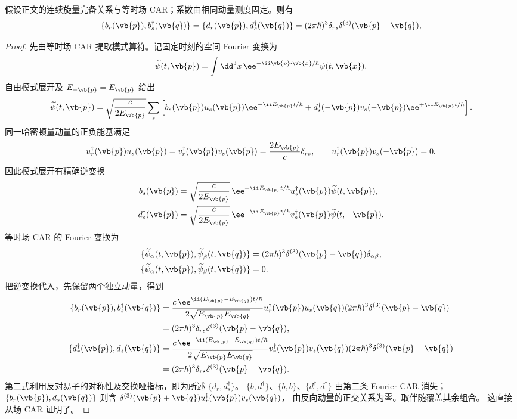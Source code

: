 \begin{proposition}
假设正文的连续旋量完备关系与等时场 CAR；系数由相同动量测度固定。则有
\begin{equation}
{
\{b_r(\vb{p}),b_s^\dagger(\vb{q})\}
=\{d_r(\vb{p}),d_s^\dagger(\vb{q})\}
=(2\pi\hbar)^3\delta_{rs}\delta^{(3)}(\vb{p}-\vb{q}),}
\label{eq:fermion-anticomm-normalization-r2}
\end{equation}
\end{proposition}
\begin{proof}
先由等时场 CAR 提取模式算符。记固定时刻的空间 Fourier 变换为
\[
\widetilde\psi(t,\vb{p})
=\int\dd^3x\,\ee^{-\ii\vb{p}\cdot\vb{x}/\hbar}\psi(t,\vb{x}).
\]
自由模式展开及 $E_{-\vb{p}}=E_{\vb{p}}$ 给出
\[
\widetilde\psi(t,\vb{p})
=\sqrt{\frac{c}{2E_{\vb{p}}}}
\sum_s\left[
b_s(\vb{p})u_s(\vb{p})\ee^{-\ii E_{\vb{p}}t/\hbar}
+d_s^\dagger(-\vb{p})v_s(-\vb{p})\ee^{+\ii E_{\vb{p}}t/\hbar}
\right].
\]
同一哈密顿量动量的正负能基满足
\[
u_r^\dagger(\vb{p})u_s(\vb{p})
=v_r^\dagger(\vb{p})v_s(\vb{p})
=\frac{2E_{\vb{p}}}c\delta_{rs},
\qquad
u_r^\dagger(\vb{p})v_s(-\vb{p})=0.
\]
因此模式展开有精确逆变换
\begin{align*}
b_s(\vb{p})
&=\sqrt{\frac{c}{2E_{\vb{p}}}}\,
\ee^{+\ii E_{\vb{p}}t/\hbar}
u_s^\dagger(\vb{p})\widetilde\psi(t,\vb{p}),\\
d_s^\dagger(\vb{p})
&=\sqrt{\frac{c}{2E_{\vb{p}}}}\,
\ee^{-\ii E_{\vb{p}}t/\hbar}
v_s^\dagger(\vb{p})\widetilde\psi(t,-\vb{p}).
\end{align*}
等时场 CAR 的 Fourier 变换为
\begin{align*}
\{\widetilde\psi_\alpha(t,\vb{p}),
\widetilde\psi_\beta^\dagger(t,\vb{q})\}
&=(2\pi\hbar)^3\delta^{(3)}(\vb{p}-\vb{q})\delta_{\alpha\beta},\\
\{\widetilde\psi_\alpha(t,\vb{p}),
\widetilde\psi_\beta(t,\vb{q})\}&=0.
\end{align*}
把逆变换代入，先保留两个独立动量，得到
\begin{align*}
\{b_r(\vb{p}),b_s^\dagger(\vb{q})\}
&=\frac{c\,\ee^{\ii(E_{\vb{p}}-E_{\vb{q}})t/\hbar}}
{2\sqrt{E_{\vb{p}}E_{\vb{q}}}}
u_r^\dagger(\vb{p})u_s(\vb{q})
(2\pi\hbar)^3\delta^{(3)}(\vb{p}-\vb{q})\\
&=(2\pi\hbar)^3\delta_{rs}\delta^{(3)}(\vb{p}-\vb{q}),\\
\{d_r^\dagger(\vb{p}),d_s(\vb{q})\}
&=\frac{c\,\ee^{-\ii(E_{\vb{p}}-E_{\vb{q}})t/\hbar}}
{2\sqrt{E_{\vb{p}}E_{\vb{q}}}}
v_r^\dagger(\vb{p})v_s(\vb{q})
(2\pi\hbar)^3\delta^{(3)}(\vb{p}-\vb{q})\\
&=(2\pi\hbar)^3\delta_{rs}\delta^{(3)}(\vb{p}-\vb{q}).
\end{align*}
第二式利用反对易子的对称性及交换哑指标，即为所述 $\{d_r,d_s^\dagger\}$。
$\{b,d^\dagger\}$、$\{b,b\}$、$\{d^\dagger,d^\dagger\}$ 由第二条 Fourier CAR 消失；
$\{b_r(\vb{p}),d_s(\vb{q})\}$ 则含
$\delta^{(3)}(\vb{p}+\vb{q})u_r^\dagger(\vb{p})v_s(\vb{q})$，
由反向动量的正交关系为零。取伴随覆盖其余组合。
这直接从场 CAR 证明了。


\end{proof}
